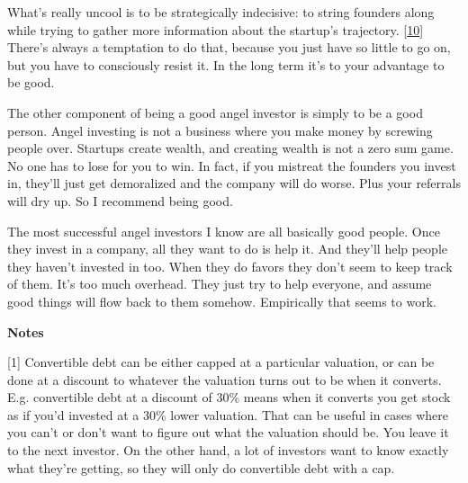 What's really uncool
                  is to be strategically indecisive: to string founders along
                  while trying to gather more information about the startup's
                  trajectory.
                  [\href{\#f10n}{10}]
                  There's always a temptation to do that, because you just have
                  so little to go on, but you have to consciously resist it. In
                  the long term it's to your advantage to be good.

The
                  other component of being a good angel investor is simply to be
                  a good person. Angel investing is not a business where you
                  make money by screwing people over. Startups create wealth,
                  and creating wealth is not a zero sum game. No one has to lose
                  for you to win. In fact, if you mistreat the founders you
                  invest in, they'll just get demoralized and the company will
                  do worse. Plus your referrals will dry up. So I recommend
                  being good.

The most successful angel investors I
                  know are all basically good people. Once they invest in a
                  company, all they want to do is help it. And they'll help
                  people they haven't invested in too. When they do favors they
                  don't seem to keep track of them. It's too much overhead. They
                  just try to help everyone, and assume good things will flow
                  back to them somehow. Empirically that seems to work.








                  \textbf{Notes}

[1] Convertible debt can be either capped at a particular
                  valuation, or can be done at a discount to whatever the
                  valuation turns out to be when it converts. E.g. convertible
                  debt at a discount of 30\% means when it converts you get stock
                  as if you'd invested at a 30\% lower valuation. That can be
                  useful in cases where you can't or don't want to figure out
                  what the valuation should be. You leave it to the next
                  investor. On the other hand, a lot of investors want to know
                  exactly what they're getting, so they will only do convertible
                  debt with a cap.

